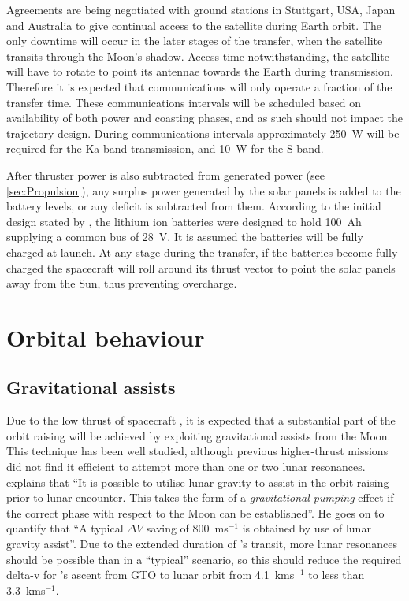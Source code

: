 Agreements are being negotiated with ground stations in Stuttgart, USA, Japan and Australia to give continual access to the satellite during Earth orbit. The only downtime will occur in the later stages of the transfer, when the satellite transits through the Moon's shadow. Access time notwithstanding, the satellite will have to rotate to point its antennae towards the Earth during transmission. Therefore it is expected that communications will only operate a fraction of the transfer time. These communications intervals will be scheduled based on availability of both power and coasting phases, and as such should not impact the trajectory design. During communications intervals approximately 250~W will be required for the Ka-band transmission, and 10~W for the S-band.

After thruster power is also subtracted from generated power (see \autoref{sec:Propulsion}), any surplus power generated by the solar panels is added to the battery levels, or any deficit is subtracted from them. According to the initial design stated by \textcite{Falke2004}, the lithium ion batteries were designed to hold 100~Ah supplying a common bus of 28~V. It is assumed the batteries will be fully charged at launch. At any stage during the transfer, if the batteries become fully charged the spacecraft will roll around its thrust vector to point the solar panels away from the Sun, thus preventing overcharge.


\section{Orbital behaviour}

\subsection{Gravitational assists} \label{sub:Grav-assist}

Due to the low thrust of spacecraft \BW, it is expected that a substantial part of the orbit raising will be achieved by exploiting gravitational assists from the Moon. This technique has been well studied, although previous higher-thrust missions did not find it efficient to attempt more than one or two lunar resonances. \textcite{Kemble2006} explains that \enquote{It is possible to utilise lunar gravity to assist in the orbit raising prior to lunar encounter. This takes the form of a \emph{gravitational pumping} effect if the correct phase with respect to the Moon can be established}. He goes on to quantify that \enquote{A typical $\Delta V$ saving of 800~ms$^{-1}$ is obtained by use of lunar gravity assist}. Due to the extended duration of \BW's transit, more lunar resonances should be possible than in a \enquote{typical} scenario, so this should reduce the required delta-v for \BW's ascent from GTO to lunar orbit from 4.1~kms$^{-1}$ to less than 3.3~kms$^{-1}$.

